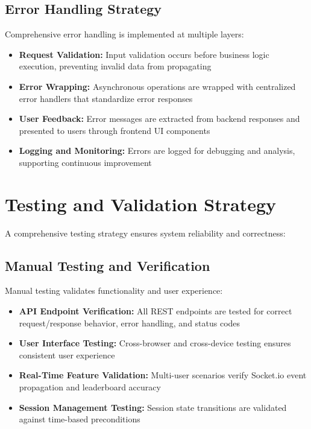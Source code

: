 \documentclass[12pt,a4paper]{report}
\begin{document}
\subsection{Error Handling Strategy}

Comprehensive error handling is implemented at multiple layers:

\begin{itemize}[left=0pt]
  \item \textbf{Request Validation:} Input validation occurs before business logic execution, preventing invalid data from propagating
  \item \textbf{Error Wrapping:} Asynchronous operations are wrapped with centralized error handlers that standardize error responses
  \item \textbf{User Feedback:} Error messages are extracted from backend responses and presented to users through frontend UI components
  \item \textbf{Logging and Monitoring:} Errors are logged for debugging and analysis, supporting continuous improvement
\end{itemize}

\section{Testing and Validation Strategy}

A comprehensive testing strategy ensures system reliability and correctness:

\subsection{Manual Testing and Verification}

Manual testing validates functionality and user experience:

\begin{itemize}[left=0pt]
  \item \textbf{API Endpoint Verification:} All REST endpoints are tested for correct request/response behavior, error handling, and status codes
  \item \textbf{User Interface Testing:} Cross-browser and cross-device testing ensures consistent user experience
  \item \textbf{Real-Time Feature Validation:} Multi-user scenarios verify Socket.io event propagation and leaderboard accuracy
  \item \textbf{Session Management Testing:} Session state transitions are validated against time-based preconditions
\end{itemize}
\end{document}
